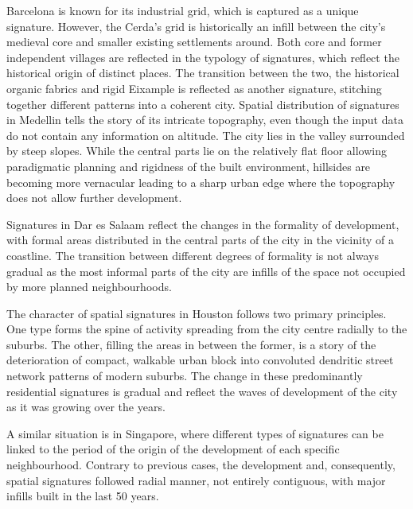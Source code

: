 Barcelona is known for its industrial grid, which is captured as a unique signature.
However, the Cerda’s grid is historically an infill between the city's medieval core and
smaller existing settlements around. Both core and former independent villages are
reflected in the typology of signatures, which reflect the historical origin of distinct
places. The transition between the two, the historical organic fabrics and rigid
Eixample is reflected as another signature, stitching together different patterns into a
coherent city.
Spatial distribution of signatures in Medellin tells the story of its intricate
topography, even though the input data do not contain any information on altitude. The
city lies in the valley surrounded by steep slopes. While the central parts lie on the
relatively flat floor allowing paradigmatic planning and rigidness of the built
environment, hillsides are becoming more vernacular leading to a sharp urban edge where
the topography does not allow further development.

Signatures in Dar es Salaam reflect the changes in the formality of development, with
formal areas distributed in the central parts of the city in the vicinity of a
coastline. The transition between different degrees of formality is not always gradual
as the most informal parts of the city are infills of the space not occupied by more
planned neighbourhoods.

The character of spatial signatures in Houston follows two primary principles. One type
forms the spine of activity spreading from the city centre radially to the suburbs. The
other, filling the areas in between the former, is a story of the deterioration of
compact, walkable urban block into convoluted dendritic street network patterns of
modern suburbs. The change in these predominantly residential signatures is gradual and
reflect the waves of development of the city as it was growing over the years.

A similar situation is in Singapore, where different types of signatures can be linked
to the period of the origin of the development of each specific neighbourhood. Contrary
to previous cases, the development and, consequently, spatial signatures followed radial
manner, not entirely contiguous, with major infills built in the last 50 years.
